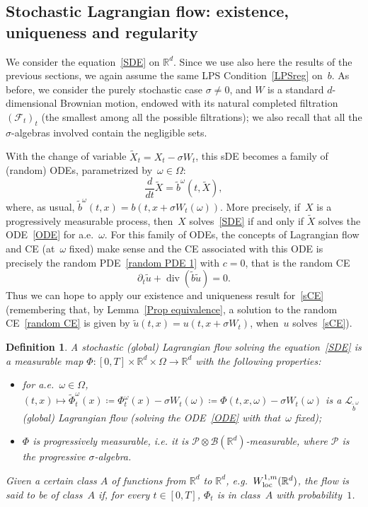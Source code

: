 \documentclass[a4paper,10pt]{article}
\newtheorem{definition}[theorem]{Definition}
\newcommand\1{\mathbbm{1}}
\newcommand{\mr}{\mathbb{R}}
\newcommand{\mc}{\mathcal}
\newcommand{\td}{\tilde}
\newcommand\loc{{\rm loc}}
\DeclareMathOperator{\diverg}{div}
\numberwithin{equation}{section}
\begin{document}
\subsection{Stochastic Lagrangian flow: existence, uniqueness and regularity}

We consider the equation~\eqref{SDE} on $\mr^d$. Since we use also here the results of the previous sections, we again assume the same LPS Condition~\ref{LPSreg} on~$b$. As before, we consider the purely stochastic case $\sigma\neq0$, and $W$ is a standard $d$-dimensional Brownian motion, endowed with its natural completed filtration $(\mc{F}_t)_t$ (the smallest among all the possible filtrations); we also recall that all the $\sigma$-algebras involved contain the negligible sets. 

With the change of variable $\td{X}_t=X_t-\sigma W_t$, this sDE becomes a family of (random) ODEs, parametrized by~$\omega\in \Omega$:
\begin{equation}
\frac{d}{dt}\td{X} =\td{b}^{\omega}(t,\td{X} ),\label{ODE}
\end{equation}
where, as usual, $\td{b}^\omega(t,x)=b(t,x+\sigma W_t(\omega))$. More precisely, if~$X$ is a progressively measurable process, then~$X$ solves~\eqref{SDE} if and only if $\td{X}$ solves the ODE~\eqref{ODE} for a.e.~$\omega$. For this family of ODEs, the concepts of Lagrangian flow and CE (at~$\omega$ fixed) make sense and the CE associated with this ODE is precisely the random PDE~\eqref{random PDE 1} with $c=0$, that is the random CE
\begin{equation}
\partial_t\td{u}+\diverg(\td{b}\td{u})=0 .\label{random CE}
\end{equation}
Thus we can hope to apply our existence and uniqueness result for~\eqref{sCE} (remembering that, by Lemma~\ref{Prop equivalence}, a solution to the random CE~\eqref{random CE} is given by $\td{u}(t,x)=u(t,x+\sigma W_t)$, when~$u$ solves~\eqref{sCE}).

\begin{definition}
A \emph{stochastic \textup{(}global\textup{)} Lagrangian flow solving the equation~\eqref{SDE}} is a measurable map $\Phi \colon [0,T]\times\mr^d\times\Omega\rightarrow\mr^d$ with the following properties:  
\begin{itemize}
\item for a.e.~$\omega \in \Omega$, $(t,x) \mapsto \td{\Phi}^\omega_t(x)\coloneqq \Phi_t^\omega(x) -\sigma W_t(\omega) \coloneqq \Phi(t,x,\omega)-\sigma W_t(\omega)$ is a $\mc{L}_{\td{b}^\omega}$ \textup{(}global\textup{)} Lagrangian flow \textup{(}solving the ODE~\eqref{ODE} with that~$\omega$ fixed\textup{)};
\item $\Phi$ is progressively measurable, i.e. it is $\mc{P}\otimes\mc{B}(\mr^d)$-measurable, where $\mc{P}$ is the progressive $\sigma$-algebra.
\end{itemize}
Given a certain class $A$ of functions from $\mr^d$ to $\mr^d$, e.g.~$W^{1,m}_{\loc}(\mr^d)$, the flow is said to be of class~$A$ if, for every $t \in [0,T]$, $\Phi_t$ is in class~$A$ with probability~$1$.
\end{definition}
\end{document}
